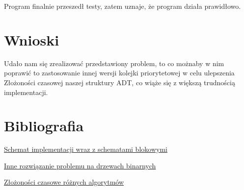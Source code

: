 \documentclass{article}
\begin{document}
Program finalnie przeszedł testy, zatem uznaje, że program działa prawidłowo.

\section{Wnioski}
Udało nam się zrealizować przedstawiony problem, to co możnaby w nim poprawić
    to zastosowanie innej wersji kolejki priorytetowej w celu ulepszenia Złożoności
    czasowej naszej struktury ADT, co wiąże się z większą trudnością implementacji.
\section{Bibliografia}
\href{https://eduinf.waw.pl/inf/alg/001_search/0106.php}{Schemat implementacji wraz z schematami blokowymi}

\href{https://bradfieldcs.com/algos/trees/priority-queues-with-binary-heaps/}{Inne rozwiązanie problemu na drzewach binarnych}

\href{https://www.hackerearth.com/practice/notes/heaps-and-priority-queues/}{Złożoności czasowe różnych algorytmów}
\end{document}
